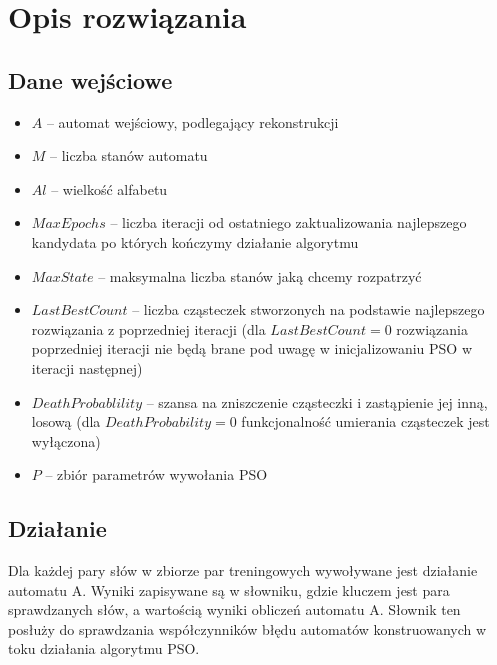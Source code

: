 \documentclass{../llncs_template/llncs}
\begin{document}
\newpage
\section{Opis rozwiązania}

\subsection*{Dane wejściowe}
\begin{itemize}
\item $A$ -- automat wejściowy, podlegający rekonstrukcji
\item $M$ -- liczba stanów automatu
\item $Al$ -- wielkość alfabetu
\item $MaxEpochs$ -- liczba iteracji od ostatniego zaktualizowania najlepszego kandydata po których kończymy działanie algorytmu
\item $MaxState$ -- maksymalna liczba stanów jaką chcemy rozpatrzyć
\item $LastBestCount$ -- liczba cząsteczek stworzonych na podstawie najlepszego rozwiązania z poprzedniej iteracji (dla $LastBestCount = 0$ rozwiązania poprzedniej iteracji nie będą brane pod uwagę w inicjalizowaniu PSO w iteracji następnej)
\item $DeathProbablility$ -- szansa na zniszczenie cząsteczki i zastąpienie jej inną, losową (dla $DeathProbability = 0$ funkcjonalność umierania cząsteczek jest wyłączona)
\item $P$ -- zbiór parametrów wywołania PSO
\end{itemize}

\subsection*{Działanie}

Dla każdej pary słów w zbiorze par treningowych wywoływane jest działanie automatu A. Wyniki zapisywane są w słowniku, gdzie kluczem jest para sprawdzanych słów, a wartością wyniki obliczeń automatu A. Słownik ten posłuży do sprawdzania współczynników błędu automatów konstruowanych w toku działania algorytmu PSO.
\end{document}
